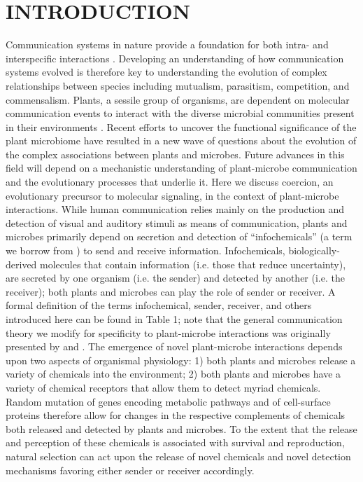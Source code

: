 \documentclass[PhD]{msu-thesis}
\begin{document}
\section{INTRODUCTION} 
Communication systems in nature provide a foundation for both intra- and interspecific interactions \cite{scott-phillips2008}. Developing an understanding of how communication systems evolved is therefore key to understanding the evolution of complex relationships between species including mutualism, parasitism, competition, and commensalism. Plants, a sessile group of organisms, are dependent on molecular communication events to interact with the diverse microbial communities present in their environments \cite{baker1997}. Recent efforts to uncover the functional significance of the plant microbiome have resulted in a new wave of questions about the evolution of the complex associations between plants and microbes. Future advances in this field will depend on a mechanistic understanding of plant-microbe communication and the evolutionary processes that underlie it. Here we discuss coercion, an evolutionary precursor to molecular signaling, in the context of plant-microbe interactions.
While human communication relies mainly on the production and detection of visual and auditory stimuli as means of communication, plants and microbes primarily depend on secretion and detection of “infochemicals” (a term we borrow from \cite{barto2012}) to send and receive information. Infochemicals, biologically-derived molecules that contain information (i.e. those that reduce uncertainty), are secreted by one organism (i.e. the sender) and detected by another (i.e. the receiver); both plants and microbes can play the role of sender or receiver. A formal definition of the terms infochemical, sender, receiver, and others introduced here can be found in Table 1; note that the general communication theory we modify for specificity to plant-microbe interactions was originally presented by \cite{scott-phillips2008} and \cite{scott-phillips2012}. The emergence of novel plant-microbe interactions depends upon two aspects of organismal physiology: 1) both plants and microbes release a variety of chemicals into the environment; 2) both plants and microbes have a variety of chemical receptors that allow them to detect myriad chemicals. Random mutation of genes encoding metabolic pathways and of cell-surface proteins therefore allow for changes in the respective complements of chemicals both released and detected by plants and microbes. To the extent that the release and perception of these chemicals is associated with survival and reproduction, natural selection can act upon the release of novel chemicals and novel detection mechanisms favoring either sender or receiver accordingly. 
\end{document}
